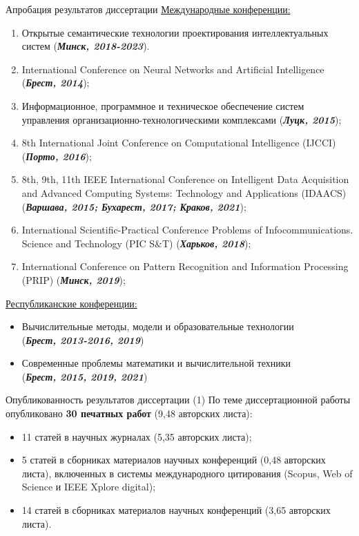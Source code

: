 \documentclass[10pt]{beamer}
\begin{document}
        \begin{frame}[shrink=5]{Апробация результатов диссертации}
            \small
            \underline{Международные конференции:}
            \begin{enumerate}
                \item Открытые семантические технологии проектирования интеллектуальных систем (\textbf{\textit{Минск, 2018-2023}}).
                \item International Conference on Neural Networks and Artificial Intelligence (\textbf{\textit{Брест, 2014}});
                \item Информационное, программное и техническое обеспечение систем управления организационно-технологическими комплексами (\textbf{\textit{Луцк, 2015}});
                \item 8th International Joint Conference on Computational Intelligence (IJCCI) (\textbf{\textit{Порто, 2016}});
                \item 8th, 9th, 11th IEEE International Conference on Intelligent Data Acquisition and Advanced Computing Systems: Technology and Applications (IDAACS) (\textbf{\textit{Варшава, 2015; Бухарест, 2017; Краков, 2021}}); 
                \item International Scientific-Practical Conference Problems of Infocommunications. Science and Technology (PIC S\&T) (\textbf{\textit{Харьков, 2018}});
                \item International Conference on Pattern Recognition and Information Processing (PRIP) (\textbf{\textit{Минск, 2019}});
            \end{enumerate}
            \underline{Республиканские конференции:}
            \begin{itemize}
                \item Вычислительные методы, модели и образовательные технологии \\ (\textbf{\textit{Брест, 2013-2016, 2019}})
                \item Современные проблемы математики и вычислительной техники \\ (\textbf{\textit{Брест, 2015, 2019, 2021}})
            \end{itemize}
        \end{frame}

        \begin{frame}{Опубликованность результатов диссертации (1)}
            По теме диссертационной работы опубликовано \textbf{30 печатных работ} (9,48 авторских листа):
            \begin{itemize}
                \item 11 статей в научных журналах (5,35 авторских листа);
                \item 5 статей в сборниках материалов научных конференций (0,48 авторских листа), включенных в системы международного цитирования (Scopus, Web of Science и IEEE Xplore digital);
                \item 14 статей в сборниках материалов научных конференций (3,65 авторских листа).
            \end{itemize}
        \end{frame}
\end{document}
